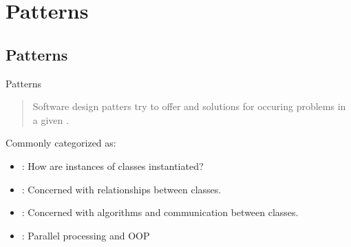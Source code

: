 \section{Patterns}


\subsection{Patterns}

\begin{frame}{Patterns}
	\begin{quote}
		Software design patters try to offer  and  solutions for  occuring problems in a given .
	\end{quote}

	\bigskip
	
	Commonly categorized as:
	
	\medskip
	\begin{itemize}
		\item 
		: How are instances of classes instantiated? 
		\item 
		: Concerned with relationships between classes. 
		\item 
		: Concerned with algorithms and communication between classes. 
		\item 
		: Parallel processing and OOP 
	\end{itemize}
\end{frame}
%
%
%